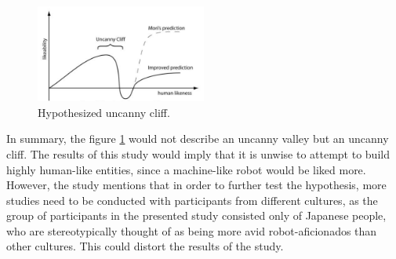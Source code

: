 \begin{figure} %
    \centering
    \includegraphics[width=0.5\textwidth]{graphics/uncanny_cliff.png}
    \caption{Hypothesized uncanny cliff.}
    \label{fig:uncannyCliff}
\end{figure}
In summary, the figure \ref{fig:uncannyCliff} would not describe an uncanny valley but an uncanny cliff.
The results of this study would imply that it is unwise to attempt to build highly human-like entities, since a machine-like robot would be liked more. 
However, the study mentions that in order to further test the hypothesis, more studies need to be conducted with participants from different cultures, as the group of participants in the presented study consisted only of Japanese people, who are stereotypically thought of as being more avid robot-aficionados than other cultures. This could distort the results of the study. \cite{uncanny_cliff}\newpage

